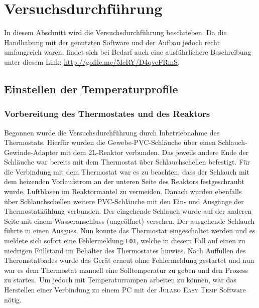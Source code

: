 \section{Versuchsdurchführung}
\label{sec:durchfuerung}
In diesem Abschnitt wird die Versuchsdurchführung beschrieben. Da die Handhabung mit der genutzten Software und der Aufbau jedoch recht umfangreich waren, findet sich bei Bedarf auch eine ausführlichere Beschreibung unter diesem Link: \underline{\url{http://gofile.me/5IeRY/D4qveFRmS}}.
\subsection{Einstellen der Temperaturprofile}
\subsubsection*{Vorbereitung des Thermostates und des Reaktors}
Begonnen wurde die Versuchsdurchführung durch Inbetriebnahme des Thermostats. Hierfür wurden die Gewebe-PVC-Schläuche über einen Schlauch-Gewinde-Adapter mit dem 2L-Reaktor verbunden. Das jeweils andere Ende der Schläuche war bereits mit dem Thermostat über Schlauchschellen befestigt. Für die Verbindung mit dem Thermostat war es zu beachten, dass der Schlauch mit dem heizenden Vorlaufstrom an der unteren Seite des Reaktors festgeschraubt wurde, Luftblasen im Reaktormantel zu vermeiden. Danach wurden ebenfalls über Schlauchschellen weitere PVC-Schläuche mit den Ein- und Ausgänge der Thermostatkühlung verbunden. Der eingehende Schlauch wurde auf der anderen Seite mit einem Wasseranschluss (ungeöffnet) versehen. Der ausgehende Schlauch führte in einen Ausguss. Nun konnte das Thermostat eingeschaltet werden und es meldete sich sofort eine Fehlermeldung \texttt{E01}, welche in diesem Fall auf einen zu niedrigen Füllstand im Behälter des Thermostates hinwies. Nach Auffüllen des Theromstatbades wurde das Gerät erneut ohne Fehlermeldung gestartet und nun war es dem Thermostat manuell eine Solltemperatur zu geben und den Prozess zu starten. Um jedoch mit Temperaturrampen arbeiten zu können, war das Herstellen einer Verbindung zu einem PC mit der \textsc{Julabo Easy Temp} Software nötig.

